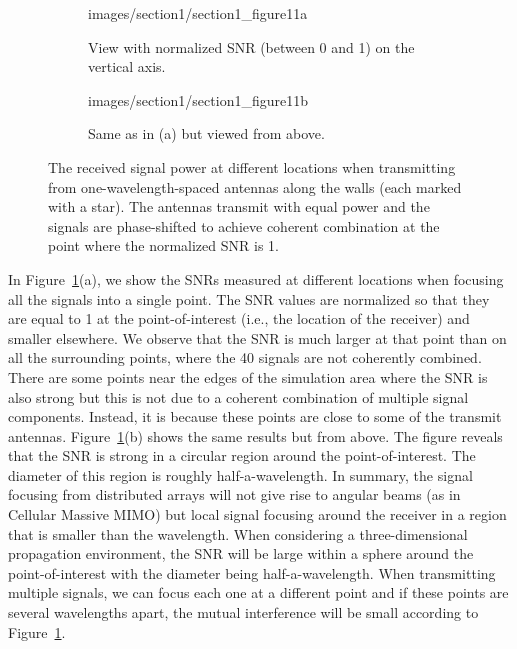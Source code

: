 \begin{figure}[t!]
	\centering  \vspace{-4mm}
        \begin{subfigure}[b]{\columnwidth} \centering
	\begin{overpic}[width=.8\columnwidth,tics=10]{images/section1/section1_figure11a}
\end{overpic} 
                \caption{View with normalized \gls{SNR} (between 0 and 1) on the vertical axis.}    \vspace{+2mm}
        \end{subfigure} 
        \begin{subfigure}[b]{\columnwidth} \centering 
	\begin{overpic}[width=.8\columnwidth,tics=10]{images/section1/section1_figure11b}
\end{overpic} 
                \caption{Same as in (a) but viewed from above.} 
        \end{subfigure} 
	\caption{The received signal power at different locations when transmitting from one-wavelength-spaced antennas along the walls (each marked with a star). The antennas transmit with equal power and the signals are phase-shifted to achieve coherent combination at the point where the normalized \gls{SNR} is 1.} 
	\label{fig:distributed-focusing} \vspace{-4mm}
\end{figure}


In Figure~\ref{fig:distributed-focusing}(a), we show the \glspl{SNR} measured at different locations when focusing all the signals into a single point. The \gls{SNR} values are normalized so that they are equal to 1 at the point-of-interest (i.e., the location of the receiver) and smaller elsewhere. We observe that the \gls{SNR} is much larger at that point than on all the surrounding points, where the 40 signals are not coherently combined. There are some points near the edges of the simulation area where the \gls{SNR} is also strong but this is not due to a coherent combination of multiple signal components. Instead, it is because these points are close to some of the transmit antennas. Figure~\ref{fig:distributed-focusing}(b) shows the same results but from above. The figure reveals that the \gls{SNR} is strong in a circular region around the point-of-interest. The diameter of this region is roughly half-a-wavelength. In summary, the signal focusing from distributed arrays will not give rise to angular beams (as in Cellular Massive MIMO) but local signal focusing around the receiver in a region that is smaller than the wavelength. When considering a three-dimensional propagation environment, the \gls{SNR} will be large within a sphere around the point-of-interest with the diameter being half-a-wavelength. When transmitting multiple signals, we can focus each one at a different point and if these points are several wavelengths apart, the mutual interference will be small according to Figure~\ref{fig:distributed-focusing}.



